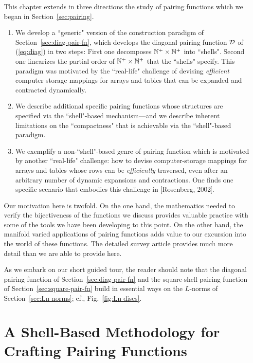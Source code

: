 \noindent
This chapter extends in three directions the study of pairing functions which we began in Section~\ref{sec:pairing}.
\begin{enumerate}
\item 
We develop a ``generic" version of the construction paradigm of Section~\ref{sec:diag-pair-fn}, which develops the diagonal pairing function $\mbox{$\cal D$}$  of (\ref{eq:diag}) in two steps: First one decomposes $\mathbb{N}^+ \times \mathbb{N}^+$ into ``shells".  Second one linearizes the partial order of $\mathbb{N}^+ \times \mathbb{N}^+$ that the ``shells" specify.  This paradigm was motivated by the ``real-life"  challenge of devising {\em efficient} computer-storage mappings for arrays and tables that can be expanded and contracted dynamically.

\item
We describe additional specific pairing functions whose structures are specified via the ``shell"-based mechanism---and we describe inherent limitations on the ``compactness" that is achievable via the ``shell"-based paradigm.
 
\item
We exemplify a non-``shell"-based genre of pairing function which is motivated by another ``real-life" challenge: how to devise computer-storage mappings for arrays and tables whose rows can be {\em efficiently} traversed, even after an arbitrary number of dynamic expansions and contractions.  One finds one specific scenario that embodies this challenge in [Rosenberg, 2002].
\end{enumerate}
Our motivation here is twofold.  On the one hand, the mathematics needed to verify the bijectiveness of the functions we discuss provides valuable practice with some of the tools we have been developing to this point.  On the other hand, the manifold varied applications of pairing functions adds value to our excursion into the world of these functions.  The detailed survey article \cite{Rosenberg03} provides much more detail than we are able to provide here.

\bigskip

As we embark on our short guided tour, the reader should note that the diagonal pairing function of Section~\ref{sec:diag-pair-fn} and the square-shell pairing function of
Section~\ref{sec:square-pair-fn} build in essential ways on the $L$-norms of Section~\ref{sec:Ln-norms}; cf., Fig.~\ref{fig:Ln-discs}.


\section{A Shell-Based Methodology for Crafting Pairing Functions}
\label{sec:build-pair-fn}

